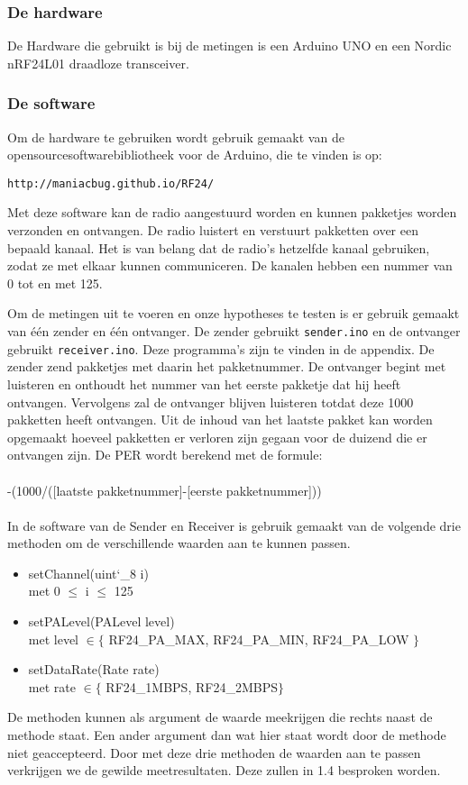 \documentclass{article}
\begin{document}
\subsubsection{De hardware}
De Hardware die gebruikt is bij de metingen is een Arduino UNO en een Nordic nRF24L01 draadloze transceiver.\\

\subsubsection{De software}
Om de hardware te gebruiken wordt gebruik gemaakt van de opensourcesoftwarebibliotheek voor de Arduino, die te vinden is op: \begin{verbatim}http://maniacbug.github.io/RF24/ \end{verbatim} 

Met deze software kan de radio aangestuurd worden en kunnen pakketjes worden verzonden en ontvangen. De radio luistert en verstuurt pakketten over een bepaald kanaal. Het is van belang dat de radio's hetzelfde kanaal gebruiken, zodat ze met elkaar kunnen communiceren. De kanalen hebben een nummer van 0 tot en met 125. 

Om de metingen uit te voeren en onze hypotheses te testen is er gebruik gemaakt van \'{e}\'{e}n zender en \'{e}\'{e}n ontvanger. De zender gebruikt \texttt{sender.ino} en de ontvanger gebruikt \texttt{receiver.ino}. Deze programma's zijn te vinden in de appendix. De zender zend pakketjes met daarin het pakketnummer. De ontvanger begint met luisteren en onthoudt het nummer van het eerste pakketje dat hij heeft ontvangen. Vervolgens zal de ontvanger blijven luisteren totdat deze 1000 pakketten heeft ontvangen. Uit de inhoud van het laatste pakket kan worden opgemaakt hoeveel pakketten er verloren zijn gegaan voor de duizend die er ontvangen zijn. De PER wordt berekend met de formule:\\
\\
-(1000/([laatste pakketnummer]-[eerste pakketnummer]))\\
\\
In de software van de Sender en Receiver is gebruik gemaakt van de volgende drie methoden om de verschillende waarden aan te kunnen passen. 
\begin{itemize}
	\item setChannel(uint\char`_8 i) \\
	met 0 $\leq$ i $\leq$ 125
	\item setPALevel(PALevel level) \\
	met level $\in \{$  RF24\_PA\_MAX, RF24\_PA\_MIN, RF24\_PA\_LOW $\}$
	\item setDataRate(Rate rate) \\
	met rate $\in \{$ RF24\_1MBPS, RF24\_2MBPS$\}$
\end{itemize}
De methoden kunnen als argument de waarde meekrijgen die rechts naast de methode staat. Een ander argument dan wat hier staat wordt door de methode niet geaccepteerd. 
Door met deze drie methoden de waarden aan te passen verkrijgen we de gewilde meetresultaten. Deze zullen in 1.4 besproken worden.\\
\end{document}
